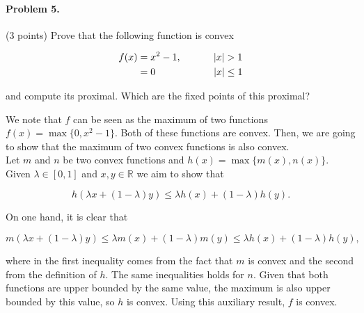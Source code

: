 \documentclass[12pt]{scrartcl}
\begin{document}

\begin{boxF}
\paragraph*{Problem 5.} (3 points) \hspace{0.15em} Prove that the following function is convex

    \begin{align*}
        f(x) &= x^2 -1, \hspace{3.3em} |x| > 1 \\
             &= 0       \hspace{6em} |x| \leq 1
    \end{align*}

and compute its proximal. Which are the fixed points of this proximal?
\end{boxF}

We note that $f$ can be seen as the maximum of two functions $f(x) = \max\{0, x^2-1\}$. Both of these functions are convex. Then, we are going to show that the maximum of two convex functions is also convex. \\

Let $m$ and $n$ be two convex functions and $h(x) = \max\{m(x), n(x)\}$. Given $\lambda \in [0,1]$ and $x, y \in \mathbb{R}$ we aim to show that 

\[
    h(\lambda x + (1- \lambda)y) \leq \lambda h(x) + (1- \lambda)h(y).
\]

On one hand, it is clear that 

\[
    m\left(\lambda x + (1- \lambda)y \right) \leq  \lambda m(x) + (1- \lambda)m(y) \leq  \lambda h(x) + (1- \lambda)h(y),
\]

where in the first inequality comes from the fact that $m$ is convex and the second from the definition of $h$. The same inequalities holds for $n$. Given that both functions are upper bounded by the same value, the maximum is also upper bounded by this value, so $h$ is convex. Using this auxiliary result, $f$ is convex. \\


\end{document}
